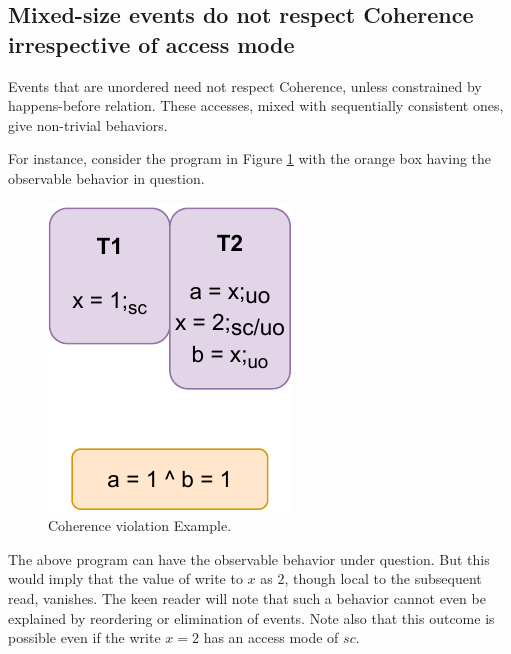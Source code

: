     \subsection{Mixed-size events do not respect Coherence irrespective of access mode}

        Events that are unordered need not respect Coherence, unless constrained by happens-before relation.
        These accesses, mixed with sequentially consistent ones, give non-trivial behaviors.

        For instance, consider the program in Figure \ref{crit:coherence} with the orange box having the observable behavior in question.
        \begin{figure}[H]
            \centering
            \includegraphics[scale=0.7]{6.ConclusionFutureWork/CoherenceNormal.pdf}
            \caption{Coherence violation Example.}
            \label{crit:coherence}
        \end{figure}

        The above program can have the observable behavior under question.
        But this would imply that the value of write to $x$ as $2$, though local to the subsequent read, vanishes. 
        The keen reader will note that such a behavior cannot even be explained by reordering or elimination of events.
        Note also that this outcome is possible even if the write $x=2$ has an access mode of $sc$. 

